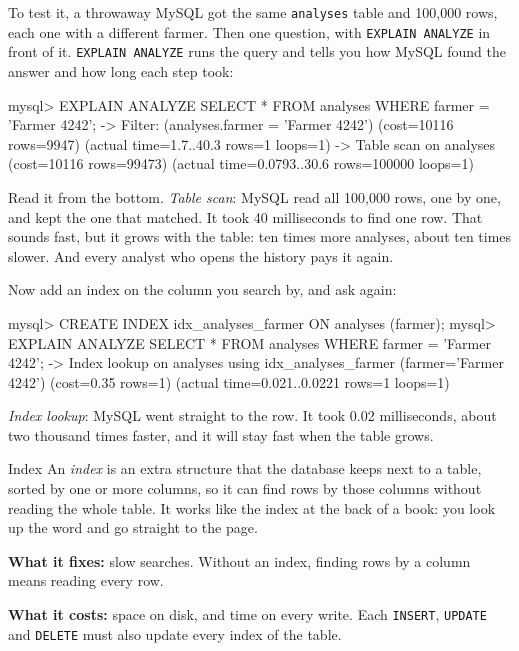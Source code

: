 To test it, a throwaway MySQL got the same \texttt{analyses} table and
100,000 rows, each one with a different farmer. Then one question, with
\texttt{EXPLAIN ANALYZE} in front of it. \texttt{EXPLAIN ANALYZE} runs the
query and tells you how MySQL found the answer and how long each step took:

\begin{terminal}
mysql> EXPLAIN ANALYZE SELECT * FROM analyses WHERE farmer = 'Farmer 4242';
-> Filter: (analyses.farmer = 'Farmer 4242')  (cost=10116 rows=9947)
   (actual time=1.7..40.3 rows=1 loops=1)
    -> Table scan on analyses  (cost=10116 rows=99473)
       (actual time=0.0793..30.6 rows=100000 loops=1)
\end{terminal}

Read it from the bottom. \emph{Table scan}: MySQL read all 100,000 rows, one
by one, and kept the one that matched. It took 40 milliseconds to find one
row. That sounds fast, but it grows with the table: ten times more analyses,
about ten times slower. And every analyst who opens the history pays it
again.

Now add an index on the column you search by, and ask again:

\begin{terminal}
mysql> CREATE INDEX idx_analyses_farmer ON analyses (farmer);
mysql> EXPLAIN ANALYZE SELECT * FROM analyses WHERE farmer = 'Farmer 4242';
-> Index lookup on analyses using idx_analyses_farmer
   (farmer='Farmer 4242')  (cost=0.35 rows=1)
   (actual time=0.021..0.0221 rows=1 loops=1)
\end{terminal}

\emph{Index lookup}: MySQL went straight to the row. It took 0.02
milliseconds, about two thousand times faster, and it will stay fast when
the table grows.

\begin{concept}{Index}
An \emph{index} is an extra structure that the database keeps next to a
table, sorted by one or more columns, so it can find rows by those columns
without reading the whole table. It works like the index at the back of a
book: you look up the word and go straight to the page.

\textbf{What it fixes:} slow searches. Without an index, finding rows by a
column means reading every row.

\textbf{What it costs:} space on disk, and time on every write. Each
\texttt{INSERT}, \texttt{UPDATE} and \texttt{DELETE} must also update every
index of the table.
\end{concept}


